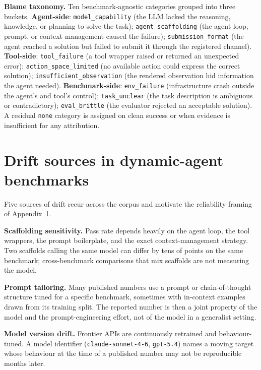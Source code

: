 \documentclass{article}
\newcommand{\mypar}[1]{\par\noindent\textbf{#1}\enspace}
\begin{document}
\mypar{Blame taxonomy.}
Ten benchmark-agnostic categories grouped into three buckets.
\textbf{Agent-side}: \texttt{model\_capability} (the LLM lacked the
reasoning, knowledge, or planning to solve the task);
\texttt{agent\_scaffolding} (the agent loop, prompt, or context
management caused the failure); \texttt{submission\_format} (the agent
reached a solution but failed to submit it through the registered
channel). \textbf{Tool-side}: \texttt{tool\_failure} (a tool wrapper
raised or returned an unexpected error); \texttt{action\_space\_limited}
(no available action could express the correct solution);
\texttt{insufficient\_observation} (the rendered observation hid
information the agent needed). \textbf{Benchmark-side}:
\texttt{env\_failure} (infrastructure crash outside the agent's and
tool's control); \texttt{task\_unclear} (the task description is
ambiguous or contradictory); \texttt{eval\_brittle} (the evaluator
rejected an acceptable solution). A residual \texttt{none} category is
assigned on clean success or when evidence is insufficient for any
attribution.

\section{Drift sources in dynamic-agent benchmarks}
\label{apdx:reproducibility}

Five sources of drift recur across the corpus and motivate the
reliability framing of Appendix~\ref{apdx:reproducibility}.

\mypar{Scaffolding sensitivity.}
Pass rate depends heavily on the agent loop, the tool wrappers, the
prompt boilerplate, and the exact context-management strategy. Two
scaffolds calling the same model can differ by tens of points on the
same benchmark; cross-benchmark comparisons that mix scaffolds are not
measuring the model.

\mypar{Prompt tailoring.}
Many published numbers use a prompt or chain-of-thought structure tuned
for a specific benchmark, sometimes with in-context examples drawn from
its training split. The reported number is then a joint property of the
model and the prompt-engineering effort, not of the model in a
generalist setting.

\mypar{Model version drift.}
Frontier APIs are continuously retrained and behaviour-tuned. A model
identifier (\texttt{claude-sonnet-4-6}, \texttt{gpt-5.4}) names a moving
target whose behaviour at the time of a published number may not be
reproducible months later.
\end{document}
